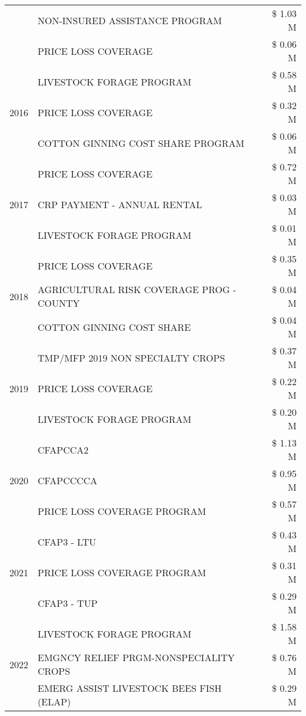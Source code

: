 \begin{tabular}{llr}
 & NON-INSURED ASSISTANCE PROGRAM & \$ 1.03 M \\
 & PRICE LOSS COVERAGE & \$ 0.06 M \\
\cline{1-3}
\multirow[t]{3}{*}{2016} & LIVESTOCK FORAGE PROGRAM & \$ 0.58 M \\
 & PRICE LOSS COVERAGE & \$ 0.32 M \\
 & COTTON GINNING COST SHARE PROGRAM & \$ 0.06 M \\
\cline{1-3}
\multirow[t]{3}{*}{2017} & PRICE LOSS COVERAGE & \$ 0.72 M \\
 & CRP PAYMENT - ANNUAL RENTAL & \$ 0.03 M \\
 & LIVESTOCK FORAGE PROGRAM & \$ 0.01 M \\
\cline{1-3}
\multirow[t]{3}{*}{2018} & PRICE LOSS COVERAGE & \$ 0.35 M \\
 & AGRICULTURAL RISK COVERAGE PROG - COUNTY & \$ 0.04 M \\
 & COTTON GINNING COST SHARE & \$ 0.04 M \\
\cline{1-3}
\multirow[t]{3}{*}{2019} & TMP/MFP 2019 NON SPECIALTY CROPS & \$ 0.37 M \\
 & PRICE LOSS COVERAGE & \$ 0.22 M \\
 & LIVESTOCK FORAGE PROGRAM & \$ 0.20 M \\
\cline{1-3}
\multirow[t]{3}{*}{2020} & CFAPCCA2 & \$ 1.13 M \\
 & CFAPCCCCA & \$ 0.95 M \\
 & PRICE LOSS COVERAGE PROGRAM & \$ 0.57 M \\
\cline{1-3}
\multirow[t]{3}{*}{2021} & CFAP3 - LTU & \$ 0.43 M \\
 & PRICE LOSS COVERAGE PROGRAM & \$ 0.31 M \\
 & CFAP3 - TUP & \$ 0.29 M \\
\cline{1-3}
\multirow[t]{3}{*}{2022} & LIVESTOCK FORAGE PROGRAM & \$ 1.58 M \\
 & EMGNCY RELIEF PRGM-NONSPECIALITY CROPS & \$ 0.76 M \\
 & EMERG ASSIST LIVESTOCK BEES FISH (ELAP) & \$ 0.29 M \\
\cline{1-3}
\bottomrule
\end{tabular}
